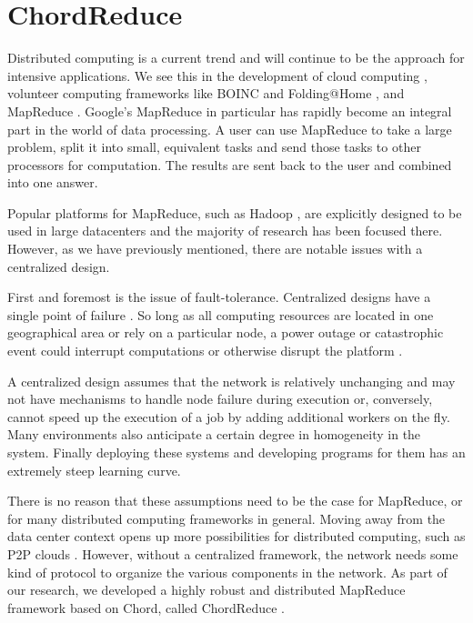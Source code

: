 \chapter{ChordReduce}
\label{chapter:chordreduce}


Distributed computing is a current trend and will continue to be the approach for intensive  applications.
We see this in the development of cloud computing \cite{p2p-cloud}, volunteer computing frameworks like BOINC \cite{anderson2004boinc} and Folding@Home \cite{larson2002folding}, and MapReduce  \cite{mapreduce}.
Google's MapReduce  in particular has rapidly become an integral part in the world of data processing.
A user can use MapReduce to take a large problem, split it into small, equivalent tasks and send those tasks to other processors for computation.
The results are sent back to the user and combined into one answer.

Popular platforms for MapReduce, such as Hadoop \cite{hadoop}  \cite{shvachko2010hadoop}, are explicitly designed to be used in large datacenters \cite{hadoopAssumptions} and the majority of research has been focused there.
However, as we have previously mentioned, there are notable issues with a centralized design.

First and foremost is the issue of fault-tolerance.
Centralized designs have a single point of failure \cite{shvachko2010hadoop}.
So long as all computing resources are located in one geographical area or rely on a particular node, a power outage or catastrophic event could interrupt computations or otherwise disrupt the platform \cite{babaoglu2014people}.

A centralized design assumes that the network is relatively unchanging and may not have mechanisms to handle node failure during execution or, conversely, cannot speed up the execution of a job by adding additional workers on the fly.
Many environments also anticipate a certain degree in homogeneity in the system.
Finally deploying these systems and developing programs for them has an extremely steep learning curve.

There is no reason that these assumptions need to be the case for MapReduce, or for many distributed computing frameworks in general.
Moving away from the data center context opens up more possibilities for distributed computing, such as P2P clouds \cite{p2p-cloud}.
However, without a centralized framework, the network needs some kind of protocol to organize the various components in the network.
As part of our research, we developed a highly robust and distributed MapReduce framework based on Chord, called ChordReduce \cite{chordreduce}.


